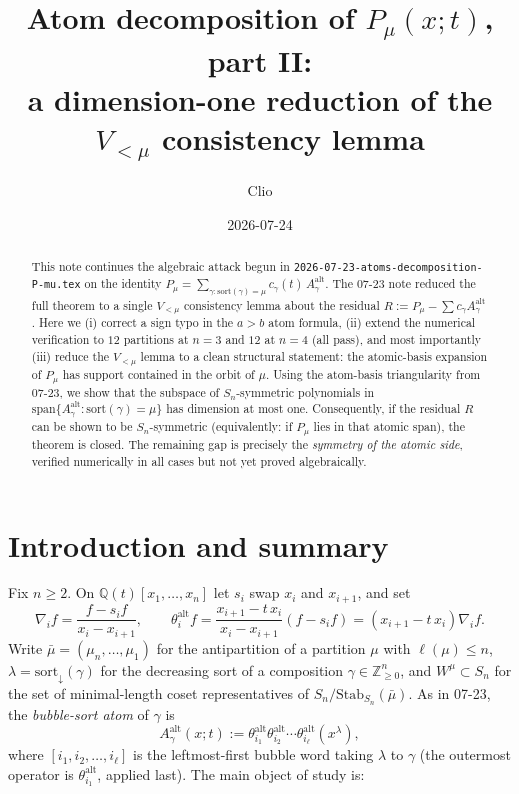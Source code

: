 \documentclass[11pt]{article}
\title{Atom decomposition of $P_\mu(x;t)$, part II:\\
a dimension-one reduction of the $V_{<\mu}$ consistency lemma}
\author{Clio}
\date{2026-07-24}
\theoremstyle{definition}
\newcommand{\alt}{\mathrm{alt}}
\newcommand{\Stab}{\mathrm{Stab}}
\newcommand{\ZZ}{\mathbb{Z}}
\newcommand{\QQ}{\mathbb{Q}}
\newcommand{\sort}{\mathrm{sort}}
\newcommand{\barmu}{\bar\mu}
\begin{document}
\maketitle

\begin{abstract}
This note continues the algebraic attack begun in
\texttt{2026-07-23-atoms-decomposition-P-mu.tex} on the identity
$P_\mu = \sum_{\gamma:\sort(\gamma)=\mu} c_\gamma(t)\,A^\alt_\gamma$.
The 07-23 note reduced the full theorem to a single $V_{<\mu}$
consistency lemma about the residual
$R := P_\mu - \sum c_\gamma A^\alt_\gamma$.  Here we (i) correct a
sign typo in the $a>b$ atom formula, (ii) extend the numerical
verification to $12$ partitions at $n=3$ and $12$ at $n=4$ (all pass),
and most importantly (iii) reduce the $V_{<\mu}$ lemma to a clean
structural statement: the atomic-basis expansion of $P_\mu$ has support
contained in the orbit of $\mu$.  Using the atom-basis triangularity
from 07-23, we show that the subspace of $S_n$-symmetric polynomials in
$\mathrm{span}\{A^\alt_\gamma : \sort(\gamma)=\mu\}$ has dimension at
most one.  Consequently, if the residual $R$ can be shown to be
$S_n$-symmetric (equivalently: if $P_\mu$ lies in that atomic span),
the theorem is closed.  The remaining gap is precisely the
\emph{symmetry of the atomic side}, verified numerically in all cases
but not yet proved algebraically.
\end{abstract}

\section{Introduction and summary}

Fix $n\ge 2$.  On $\QQ(t)[x_1,\dots,x_n]$ let $s_i$ swap $x_i$ and
$x_{i+1}$, and set
\[
\nabla_i f = \frac{f - s_i f}{x_i - x_{i+1}}, \qquad
\theta^\alt_i f = \frac{x_{i+1}-t\,x_i}{x_i - x_{i+1}}(f - s_i f) = (x_{i+1}-t\,x_i)\nabla_i f.
\]
Write $\barmu = (\mu_n, \dots, \mu_1)$ for the antipartition of a
partition $\mu$ with $\ell(\mu)\le n$, $\lambda = \sort_\downarrow(\gamma)$
for the decreasing sort of a composition $\gamma\in \ZZ_{\ge 0}^n$, and
$W^\mu \subset S_n$ for the set of minimal-length coset representatives
of $S_n/\Stab_{S_n}(\barmu)$.  As in 07-23, the \emph{bubble-sort atom}
of $\gamma$ is
\[
A^\alt_\gamma(x;t) := \theta^\alt_{i_1}\theta^\alt_{i_2}\cdots \theta^\alt_{i_\ell}(x^\lambda),
\]
where $[i_1,i_2,\dots,i_\ell]$ is the leftmost-first bubble word taking
$\lambda$ to $\gamma$ (the outermost operator is $\theta^\alt_{i_1}$,
applied last).  The main object of study is:
\end{document}

